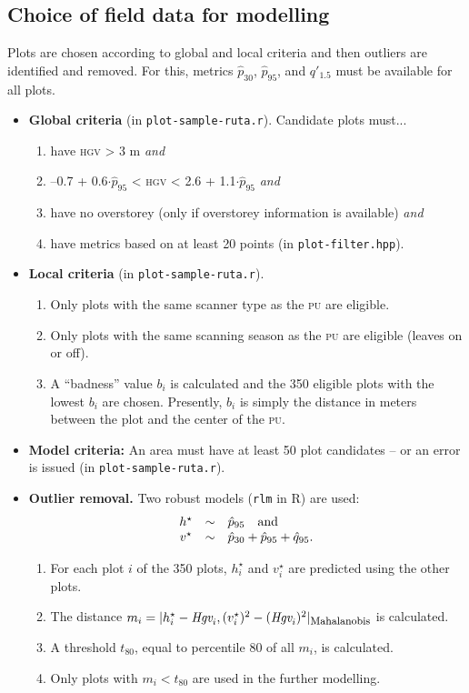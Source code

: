 \documentclass[english,a4paper,minion,nofigsidecaption]{article}
\providecommand{\abbr}[1]{\texorpdfstring{\textsc{\MakeLowercase{#1}}}{#1}}
\newcommand{\pu}{\abbr{PU}}
\newcommand{\first}[1]{\ensuremath{\hat{#1}}}
\newcommand{\perc}[1]{\ensuremath{\first{p}_{#1}}}
\newcommand{\hveg}[1]{\ensuremath{\first{q}_{#1}}}
\newcommand{\prop}[1]{\ensuremath{q'_{#1}}}
\newcommand{\thresholdperc}{80}
\newcommand{\numofplots}{350}
\begin{document}
\subsection{Choice of field data for modelling}

Plots are chosen according to global and local criteria and then outliers are identified and removed. 
For this, metrics \perc{30}, \perc{95}, and \prop{1.5} must be available for all plots. 
\begin{itemize}
	\item \textbf{Global criteria} (in \texttt{plot-sample-ruta.r}). Candidate plots must...
		\begin{enumerate}
			\item have \abbr{HGV} > 3 m \emph{and} 
			\item –0.7 + 0.6$\cdot$\perc{95} < \abbr{HGV} < 2.6 + 1.1$\cdot$\perc{95} \emph{and}
			\item have no overstorey (only if overstorey information is available) \emph{and} 
			\item have metrics based on at least 20 points (in \texttt{plot-filter.hpp}). 
		\end{enumerate}
	\item \textbf{Local criteria} (in \texttt{plot-sample-ruta.r}).  
		\begin{enumerate}
			\item Only plots with the same scanner type as the {\pu} are eligible. 
			\item Only plots with the same scanning season as the {\pu} are eligible (leaves on or off). 
			\item A “badness” value $b_i$ is calculated and the {\numofplots} eligible plots with the lowest $b_i$ are chosen. Presently, $b_i$ is simply the distance in meters between the plot and the center of the \pu. 
		\end{enumerate}
	\item \textbf{Model criteria:} An area must have at least 50 plot candidates – or an error is issued (in \texttt{plot-sample-ruta.r}). 
	\item \textbf{Outlier removal.} Two robust models (\texttt{rlm} in R) are used:
		$$
			\begin{array}{c@{\quad\sim\quad}l}
				h^\star   	& \perc{95}	\quad\textrm{and}\\
				v^\star		& \perc{30} + \perc{95} + \hveg{95}.
			\end{array}
		$$
		\begin{enumerate}
			\item For each plot $i$ of the {\numofplots} plots, $h^\star_i$ and $v^\star_i$ are predicted using the other plots. 
			\item The distance $m_i = |h^\star_i - \textit{Hgv}_i, (v^\star_i)^2 - (\textit{Hgv}_i)^2|_\textrm{\footnotesize{Mahalanobis}}$ is calculated. 
			\item A threshold $t_{\thresholdperc}$, equal to percentile {\thresholdperc} of all $m_i$, is calculated. 
			\item Only plots with $m_i < t_{\thresholdperc}$ are used in the further modelling. 
		\end{enumerate}
\end{itemize}
\end{document}
